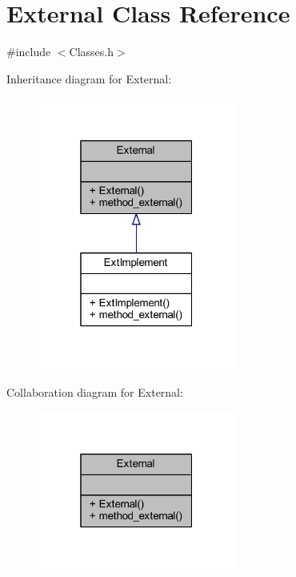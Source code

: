 \hypertarget{class_external}{}\section{External Class Reference}
\label{class_external}


{\ttfamily \#include $<$Classes.\+h$>$}



Inheritance diagram for External\+:
\nopagebreak
\begin{figure}[H]
\begin{center}
\leavevmode
\includegraphics[width=184pt]{class_external__inherit__graph}
\end{center}
\end{figure}


Collaboration diagram for External\+:
\nopagebreak
\begin{figure}[H]
\begin{center}
\leavevmode
\includegraphics[width=184pt]{class_external__coll__graph}
\end{center}
\end{figure}
